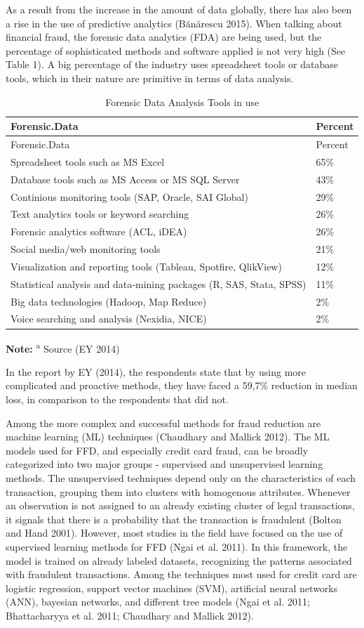 \documentclass[12pt,]{article}
\begin{document}
As a result from the increase in the amount of data globally, there has
also been a rise in the use of predictive analytics (Bănărescu 2015).
When talking about financial fraud, the forensic data analytics (FDA)
are being used, but the percentage of sophisticated methods and software
applied is not very high (See Table 1). A big percentage of the industry
uses spreadsheet tools or database tools, which in their nature are
primitive in terms of data analysis.

\begin{longtable}[]{@{}ll@{}}
\caption{Forensic Data Analysis Tools in use}\tabularnewline
\toprule
Forensic.Data & Percent\tabularnewline
\midrule
\endfirsthead
\toprule
Forensic.Data & Percent\tabularnewline
\midrule
\endhead
Spreadsheet tools such as MS Excel & 65\%\tabularnewline
Database tools such as MS Access or MS SQL Server & 43\%\tabularnewline
Continious monitoring tools (SAP, Oracle, SAI Global) &
29\%\tabularnewline
Text analytics tools or keyword searching & 26\%\tabularnewline
Forensic analytics software (ACL, iDEA) & 26\%\tabularnewline
Social media/web monitoring tools & 21\%\tabularnewline
Visualization and reporting tools (Tableau, Spotfire, QlikView) &
12\%\tabularnewline
Statistical analysis and data-mining packages (R, SAS, Stata, SPSS) &
11\%\tabularnewline
Big data technologies (Hadoop, Map Reduce) & 2\%\tabularnewline
Voice searching and analysis (Nexidia, NICE) & 2\%\tabularnewline
\bottomrule
\end{longtable}

\textbf{Note:} \textsuperscript{a} Source (EY 2014)

In the report by EY (2014), the respondents state that by using more
complicated and proactive methods, they have faced a 59,7\% reduction in
median loss, in comparison to the respondents that did not.

Among the more complex and successful methods for fraud reduction are
machine learning (ML) techniques (Chaudhary and Mallick 2012). The ML
models used for FFD, and especially credit card fraud, can be broadly
categorized into two major groups - supervised and unsupervised learning
methods. The unsupervised techniques depend only on the characteristics
of each transaction, grouping them into clusters with homogenous
attributes. Whenever an observation is not assigned to an already
existing cluster of legal transactions, it signals that there is a
probability that the transaction is fraudulent (Bolton and Hand 2001).
However, most studies in the field have focused on the use of supervised
learning methods for FFD (Ngai et al. 2011). In this framework, the
model is trained on already labeled datasets, recognizing the patterns
associated with fraudulent transactions. Among the techniques most used
for credit card are logistic regression, support vector machines (SVM),
artificial neural networks (ANN), bayesian networks, and different tree
models (Ngai et al. 2011; Bhattacharyya et al. 2011; Chaudhary and
Mallick 2012).
\end{document}
